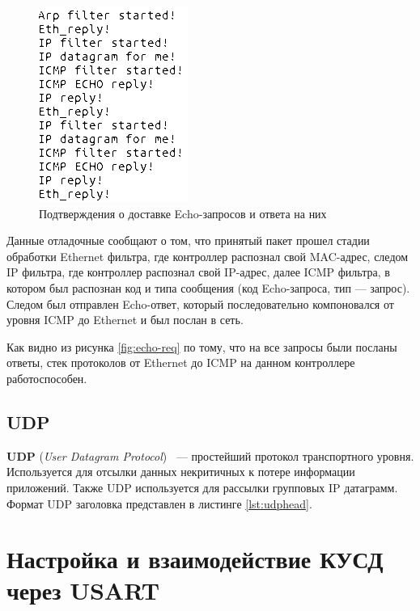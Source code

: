 \begin{figure}[h!]
	\centering
		\includegraphics[scale=0.7]{img/echo-reply-log.png}
	\caption{Подтверждения о доставке Echo-запросов и ответа на них\label{fig:echo-reply-log}}
\end{figure}

Данные отладочные сообщают о том, что принятый пакет прошел стадии обработки Ethernet фильтра, где контроллер распознал свой MAC-адрес, следом IP фильтра, где контроллер распознал свой IP-адрес, далее ICMP фильтра, в котором был распознан код и типа сообщения (код Echo-запроса, тип --- запрос). Следом был отправлен Echo-ответ, который последовательно компоновался от уровня ICMP до Ethernet и был послан в сеть.

Как видно из рисунка \ref{fig:echo-req} по тому, что на все запросы были посланы ответы, стек протоколов от Ethernet до ICMP на данном контроллере работоспособен.

\subsection{UDP}

\textbf{UDP} (\textit{User Datagram Protocol}) ~--- простейший протокол транспортного уровня. Используется для отсылки данных некритичных к потере информации приложений. Также UDP используется для рассылки групповых IP датаграмм. Формат UDP заголовка представлен в листинге \ref{lst:udphead}.

{\small{}}

\section{Настройка и взаимодействие КУСД через USART}

